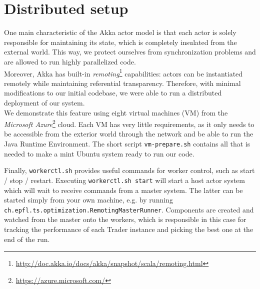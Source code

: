 
\section{Distributed setup}

One main characteristic of the Akka actor model is that each actor is solely responsible for maintaining its state, which is completely insulated from the external world. This way, we protect ourselves from synchronization problems and are allowed to run highly parallelized code.\\
Moreover, Akka has built-in \textit{remoting}\footnote{\url{http://doc.akka.io/docs/akka/snapshot/scala/remoting.html}} capabilities: actors can be instantiated remotely while maintaining referential transparency. Therefore, with minimal modifications to our initial codebase, we were able to run a distributed deployment of our system.\\

We demonstrate this feature using eight virtual machines (VM) from the \textit{Microsoft Azure}\footnote{\url{https://azure.microsoft.com/}} cloud. Each VM has very little requirements, as it only needs to be accessible from the exterior world through the network and be able to run the Java Runtime Environment. The short script \texttt{vm-prepare.sh} contains all that is needed to make a mint Ubuntu system ready to run our code.

Finally, \texttt{workerctl.sh} provides useful commands for worker control, such as start / stop / restart. Executing \texttt{workerctl.sh start} will start a host actor system which will wait to receive commands from a master system. The latter can be started simply from your own machine, e.g. by running \texttt{ch.epfl.ts.optimization.RemotingMasterRunner}. Components are created and watched from the master onto the workers, which is responsible in this case for tracking the performance of each Trader instance and picking the best one at the end of the run.
